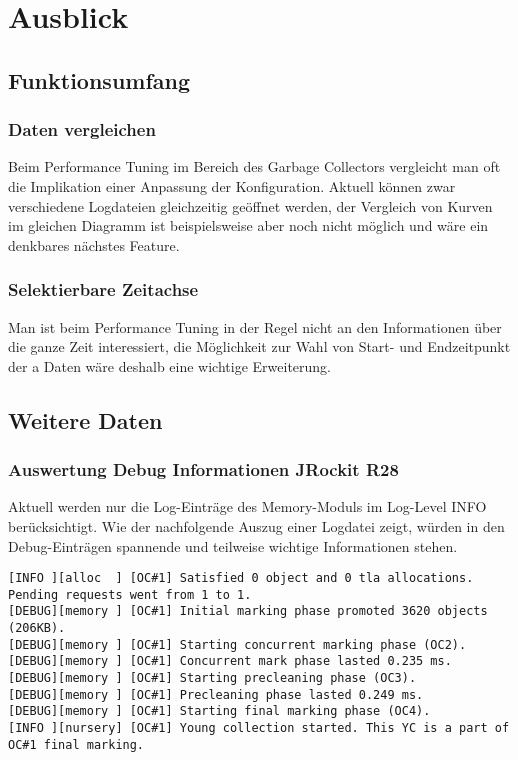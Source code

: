 \section{Ausblick}
\subsection{Funktionsumfang}
\subsubsection{Daten vergleichen}
Beim Performance Tuning im Bereich des Garbage Collectors vergleicht man oft die Implikation einer Anpassung der Konfiguration. Aktuell können zwar verschiedene Logdateien gleichzeitig geöffnet werden, der Vergleich von Kurven im gleichen Diagramm ist beispielsweise aber noch nicht möglich und wäre ein denkbares nächstes Feature.

\subsubsection{Selektierbare Zeitachse}
Man ist beim Performance Tuning in der Regel nicht an den Informationen über die ganze Zeit interessiert, die Möglichkeit zur Wahl von Start- und Endzeitpunkt der a Daten wäre deshalb eine wichtige Erweiterung.

\subsection{Weitere Daten}
\subsubsection{Auswertung Debug Informationen JRockit R28}\label{analyseumfang_jr28}
Aktuell werden nur die Log-Einträge des Memory-Moduls im Log-Level INFO berücksichtigt. Wie der nachfolgende Auszug einer Logdatei zeigt, würden in den Debug-Einträgen spannende und teilweise wichtige Informationen stehen.

\begin{lstlisting}[caption=Garbage Collection Log (Debug Informationen)]
[INFO ][alloc  ] [OC#1] Satisfied 0 object and 0 tla allocations. Pending requests went from 1 to 1.
[DEBUG][memory ] [OC#1] Initial marking phase promoted 3620 objects (206KB).
[DEBUG][memory ] [OC#1] Starting concurrent marking phase (OC2).
[DEBUG][memory ] [OC#1] Concurrent mark phase lasted 0.235 ms.
[DEBUG][memory ] [OC#1] Starting precleaning phase (OC3).
[DEBUG][memory ] [OC#1] Precleaning phase lasted 0.249 ms.
[DEBUG][memory ] [OC#1] Starting final marking phase (OC4).
[INFO ][nursery] [OC#1] Young collection started. This YC is a part of OC#1 final marking.
\end{lstlisting}


